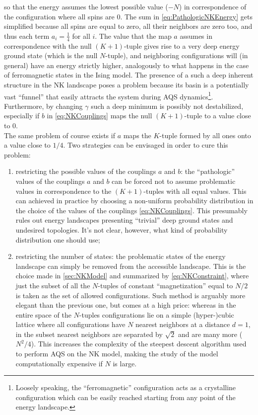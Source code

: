 so that the energy assumes the lowest possible value ($- N$) in correspondence of the configuration where all spins are $0$. The sum in \autoref{eq:PathologicNKEnergy} gets simplified because all spins are equal to zero, all their neighbors are zero too, and thus each term $a_{i} = \frac{1}{4}$ for all $i$. The value that the map $a$ assumes in correspondence with the null $(K+1)$-tuple gives rise to a very deep energy ground state (which is the null $N$-tuple), and neighboring configurations will (in general) have an energy strictly higher, analogously to what happens in the case of ferromagnetic states in the Ising model. 
The presence of a such a deep inherent structure in the NK landscape poses a problem because its basin is a potentially vast ``funnel'' that easily attracts the system during AQS dynamics\footnote{Loosely speaking, the ``ferromagnetic'' configuration acts as a crystalline configuration which can be easily reached starting from any point of the energy landscape.}. Furthermore, by changing $\gamma$ such a deep minimum is possibly not destabilized, especially if $b$ in \autoref{eq:NKCouplings} maps the null $(K+1)$-tuple to a value close to 0.\\
The same problem of course exists if $a$ maps the $K$-tuple formed by all ones onto a value close to $1/4$. 
Two strategies can be envisaged in order to cure this problem:

\begin{enumerate}
    \item restricting the possible values of the couplings $a$ and $b$: the ``pathologic'' values of the couplings $a$ and $b$ can be forced not to assume problematic values in correspondence to the $(K+1)$-tuples with all equal values. This can achieved in practice by choosing a non-uniform probability distribution in the choice of the values of the couplings \autoref{eq:NKCouplings}. This presumably rules out energy landscapes presenting ``trivial'' deep ground states and undesired topologies. It's not clear, however, what kind of probability distribution one should use;
    \item restricting the number of states: the problematic states of the energy landscape can simply be removed from the accessible landscape. This is the choice made in \autoref{sec:NKModel} and summarized by \autoref{eq:NKConstraint}, where just the subset of all the $N$-tuples of constant ``magnetization'' equal to $N/2$ is taken as the set of allowed configurations. Such method is arguably more elegant than the previous one, but comes at a high price: whereas in the entire space of the $N$-tuples configurations lie on a simple (hyper-)cubic lattice where all configurations have $N$ nearest neighbors at a distance $d=1$, in the subset nearest neighbors are separated by $\sqrt{2}$ and are many more ($N^{2}/4$). This increases the complexity of the steepest descent algorithm used to perform AQS on the NK model, making the study of the model computationally expensive if $N$ is large.
\end{enumerate}

